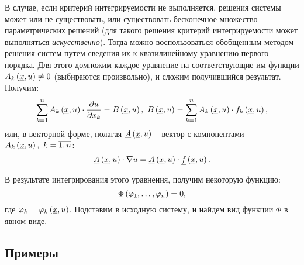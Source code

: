 	В случае, если критерий интегрируемости не выполняется, решения системы может или не существовать, или существовать бесконечное множество параметрических решений (для такого решения критерий интегрируемости может выполняться \textit{искусственно}). Тогда можно воспользоваться обобщенным методом решения систем путем сведения их к квазилинейному уравнению первого порядка. Для этого домножим каждое уравнение на соответствующие им функции $A_k\left( \underline{x}, u \right) \neq 0$ (выбираются произвольно), и сложим получившийся результат. Получим:
	\[ \sum_{k=1}^n A_k \left( \underline{x}, u \right) \cdot \dfrac{\partial u}{\partial x_k} = B\left( \underline{x}, u \right), ~ B\left( \underline{x}, u \right) = \sum_{k=1}^n A_k \left( \underline{x}, u \right) \cdot f_k \left( \underline{x}, u \right), \]
	или, в векторной форме, полагая \( \underline{A} \left( \underline{x}, u \right) \) -- вектор с компонентами $A_k\left( \underline{x}, u \right), ~ k = \overline{1, n}$:
	\[ \underline{A} \left( \underline{x}, u \right) \cdot \nabla{u} = \underline{A} \left( \underline{x}, u \right) \cdot \underline{f} \left( \underline{x}, u \right). \]

	В результате интегрирования этого уравнения, получим некоторую функцию:
	\[ \Phi\left( \varphi_1, \dots, \varphi_n \right) = 0, \]
	где $\varphi_k = \varphi_k \left( \underline{x}, u \right)$. Подставим в исходную систему, и найдем вид функции $\Phi$ в явном виде.

	\subsection{Примеры}

